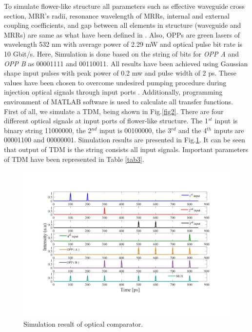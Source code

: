 \documentclass{osa-article}
\begin{document}
To simulate flower-like structure all parameters such as effective waveguide cross section, MRR’s radii, resonance wavelength of MRRs, internal and external coupling coefficients, and gap between all elements in structure (waveguide and MRRs)  are same as what have been defined in \cite{lalehsimulation}. Also, OPPs are green lasers of wavelength 532 nm with average power of 2.29 mW and optical pulse bit rate is 10 Gbit/s. Here, Simulation is done based on the string of bits for \textit{OPP A} and \textit{OPP B} as 00001111 and 00110011. All results have been achieved using Gaussian shape input pulses with peak power of 0.2 mw and pulse width of 2 ps. These values have been chosen to overcome undesired pumping procedure during injection optical signals through input ports \cite{lalehsimulation}. Additionally, programming environment of MATLAB software is used to calculate all transfer functions.
First of all, we simulate a TDM, being shown in Fig.\ref{fig2}. There are four different optical signals at input ports of flower-like structure. The 1$^{st}$ input is binary string 11000000, the 2$^{nd}$ input is 00100000, the 3$^{rd}$ and the 4$^{th}$ inputs are 00001100 and 00000001. Simulation results are presented in Fig.\ref{fig3}. It can be seen that output of TDM is the string consists all input signals. Important parameters of TDM have been represented in Table \ref{tab3}.
\begin{figure}[tb]
\centering
\includegraphics[width=5 in]{muxfi.pdf}
	\caption{Simulation result of optical comparator.}
	\label{fig3}
\end{figure}
\end{document}
